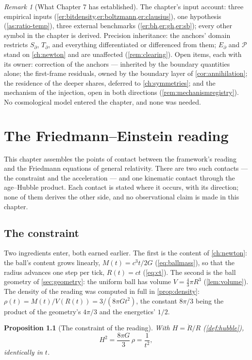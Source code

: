 \documentclass[11pt]{amsbook}
\theoremstyle{plain}
\newtheorem{proposition}[theorem]{Proposition}
\theoremstyle{definition}
\theoremstyle{remark}
\newtheorem{remark}[theorem]{Remark}
\newcommand{\uses}[1]{\par\nopagebreak\noindent{\footnotesize\emph{Uses: #1.}\par}}
\begin{document}
\begin{remark}[What Chapter 7 has established]
The chapter's input account: three empirical inputs (\cref{er:bitdensity,er:boltzmann,er:clausius}), one hypothesis (\cref{as:ratio-temp}), three external benchmarks (\cref{er:bh,er:gh,er:sb}); every other symbol in the chapter is derived. Precision inheritance: the anchors' domain restricts $S_{\partial}$, $T_{\partial}$, and everything differentiated or differenced from them; $E_{\partial}$ and $\mathcal P$ stand on \cref{ch:newton} and are unaffected (\cref{rem:clearing}). Open items, each with its owner: correction of the anchors --- inherited by the boundary quantities alone; the first-frame residuals, owned by the boundary layer of \cref{cor:annihilation}; the residence of the deeper shares, deferred to \cref{ch:symmetries}; and the mechanism of the injection, open in both directions (\cref{rem:mechanismregistry}). No cosmological model entered the chapter, and none was needed.
\end{remark}

\chapter{The Friedmann--Einstein reading}\label{ch:gr}

This chapter assembles the points of contact between the framework's reading and the Friedmann equations of general relativity. There are two such contacts --- the constraint and the acceleration --- and one kinematic contact through the age--Hubble product. Each contact is stated where it occurs, with its direction; none of them derives the other side, and no observational claim is made in this chapter.

\section{The constraint}\label{sec:constraint}

Two ingredients enter, both earned earlier. The first is the content of \cref{ch:newton}: the ball's content grows linearly, $M(t) = c^{3}t/2G$ (\cref{eq:ballmass}), so that the radius advances one step per tick, $R(t) = ct$ (\cref{eq:ct}). The second is the ball geometry of \cref{sec:geometry}: the uniform ball has volume $V = \tfrac{4}{3}\pi R^{3}$ (\cref{lem:volume}). The density of the reading was computed in full in \cref{prop:density}: $\rho(t) = M(t)/V(R(t)) = 3/(8\pi G t^{2})$, the constant $8\pi/3$ being the product of the geometry's $4\pi/3$ and the energetics' $1/2$.

\begin{proposition}[The constraint of the reading]\label{prop:constraint}
With $H = \dot R/R$ (\cref{def:hubble}),
\begin{equation}\label{eq:constraint}
H^{2} = \frac{8\pi G}{3}\,\rho = \frac{1}{t^{2}},
\end{equation}
identically in $t$.
\uses{\cref{prop:hubblelaw}, \cref{prop:density}}
\end{proposition}
\end{document}
